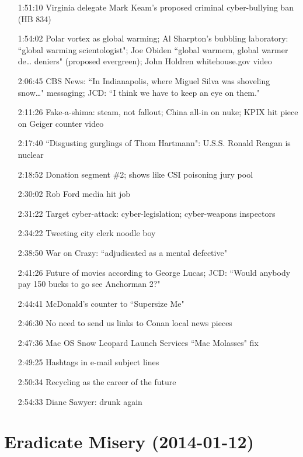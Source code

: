 \documentclass{report}
\newcommand{\mono}[1]{{\fontspec{Courier}#1}}
\begin{document}
\begin{itemize}
\item[\mono{1:51:10}] Virginia delegate Mark Keam's proposed criminal cyber-bullying ban (HB 834)
\item[\mono{1:54:02}] Polar vortex as global warming; Al Sharpton's bubbling laboratory: ``global warming scientologist"; Joe Obiden ``global warmem, global warmer de… deniers" (proposed evergreen); John Holdren whitehouse.gov video
\item[\mono{2:06:45}] CBS News: ``In Indianapolis, where Miguel Silva was shoveling snow…" messaging; JCD: ``I think we have to keep an eye on them."
\item[\mono{2:11:26}] Fake-a-shima: steam, not fallout; China all-in on nuke; KPIX hit piece on Geiger counter video
\item[\mono{2:17:40}] ``Disgusting gurglings of Thom Hartmann": U.S.S. Ronald Reagan is nuclear
\item[\mono{2:18:52}] Donation segment \#2; shows like CSI poisoning jury pool
\item[\mono{2:30:02}] Rob Ford media hit job
\item[\mono{2:31:22}] Target cyber-attack: cyber-legislation; cyber-weapons inspectors
\item[\mono{2:34:22}] Tweeting city clerk noodle boy
\item[\mono{2:38:50}] War on Crazy: ``adjudicated as a mental defective"
\item[\mono{2:41:26}] Future of movies according to George Lucas; JCD: ``Would anybody pay 150 bucks to go see Anchorman 2?"
\item[\mono{2:44:41}] McDonald's counter to ``Supersize Me"
\item[\mono{2:46:30}] No need to send us links to Conan local news pieces
\item[\mono{2:47:36}] Mac OS Snow Leopard Launch Services ``Mac Molasses" fix
\item[\mono{2:49:25}] Hashtags in e-mail subject lines
\item[\mono{2:50:34}] Recycling as the career of the future
\item[\mono{2:54:33}] Diane Sawyer: drunk again
\end{itemize}
\setcounter{section}{582}\section[Eradicate Misery]{Eradicate Misery \small{(2014-01-12)}}
\end{document}
